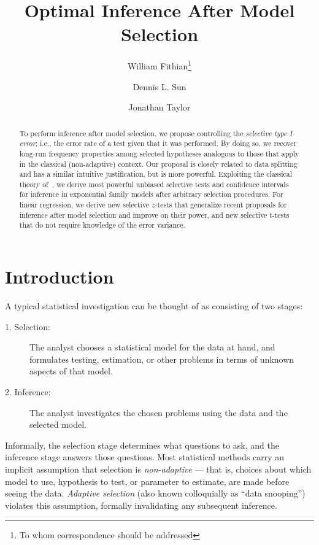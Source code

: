 \documentclass{article}
\theoremstyle{definition}
\newcommand{\sampOrData}{data }
\begin{document}
\title{Optimal Inference After Model Selection}
\author{William Fithian\footnote{To whom correspondence should be addressed}}
\author{Dennis L. Sun}
\author{Jonathan Taylor}
\maketitle


\begin{abstract}
  To perform inference after model selection, we propose controlling the {\em selective type I error}; i.e., the error rate of a test given that it was performed. By doing so, we recover long-run frequency properties among selected hypotheses analogous to those that apply in the classical (non-adaptive) context. Our proposal is closely related to \sampOrData splitting and has a similar intuitive justification, but is more powerful. Exploiting the classical theory of~\citet{lehmann1955completeness}, we derive most powerful unbiased selective tests and confidence intervals for inference in exponential family models after arbitrary selection procedures. For linear regression, we derive new selective $z$-tests that generalize recent proposals for inference after model selection and improve on their power, and new selective $t$-tests that do not require knowledge of the error variance.
\end{abstract}



\section{Introduction}\label{sec:intro}

\noindent A typical statistical investigation can be thought of as consisting of two stages:
\begin{description}
\item[1. Selection:] The analyst chooses a statistical model for the data at hand, and formulates testing, estimation, or other problems in terms of unknown aspects of that model.
\item[2. Inference:] The analyst investigates the chosen problems using the data and the selected model.
\end{description}

Informally, the selection stage determines what questions to ask, and the inference stage answers those questions. Most statistical methods carry an implicit assumption that selection is {\em non-adaptive} --- that is, choices about which model to use, hypothesis to test, or parameter to estimate, are made before seeing the data. {\em Adaptive selection} (also known colloquially as ``data snooping'') violates this assumption, formally invalidating any subsequent inference.
\end{document}
